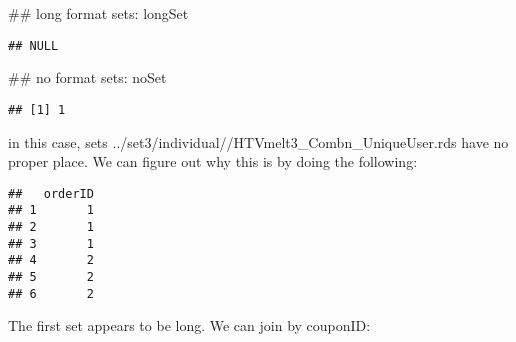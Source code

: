 \documentclass[10pt]{report}
\newenvironment{Shaded}{}{}
\newcommand{\KeywordTok}[1]{\textcolor[rgb]{0.00,0.44,0.13}{\textbf{{#1}}}}
\newcommand{\DataTypeTok}[1]{\textcolor[rgb]{0.56,0.13,0.00}{{#1}}}
\newcommand{\DecValTok}[1]{\textcolor[rgb]{0.25,0.63,0.44}{{#1}}}
\newcommand{\StringTok}[1]{\textcolor[rgb]{0.25,0.44,0.63}{{#1}}}
\newcommand{\NormalTok}[1]{{#1}}
\begin{document}
\begin{Shaded}
\begin{Highlighting}[]
\NormalTok{## long format sets:}
\NormalTok{longSet}
\end{Highlighting}
\end{Shaded}

\begin{verbatim}
## NULL
\end{verbatim}

\begin{Shaded}
\begin{Highlighting}[]
\NormalTok{## no format sets:}
\NormalTok{noSet}
\end{Highlighting}
\end{Shaded}

\begin{verbatim}
## [1] 1
\end{verbatim}

in this case, sets ../set3/individual//HTVmelt3\_Combn\_UniqueUser.rds
have no proper place. We can figure out why this is by doing the
following:

\begin{Shaded}
\end{Shaded}

\begin{verbatim}
##   orderID
## 1       1
## 2       1
## 3       1
## 4       2
## 5       2
## 6       2
\end{verbatim}

The first set appears to be long. We can join by couponID:

\begin{Shaded}
\end{Shaded}
\end{document}
